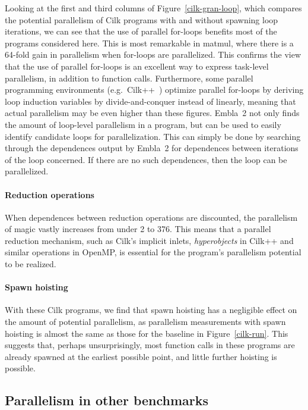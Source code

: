 Looking at the first and third columns of Figure~\ref{cilk-gran-loop}, which compares the potential parallelism of Cilk programs with and without spawning loop iterations, we can see that the use of parallel for-loops benefits most of the programs considered here.
This is most remarkable in \textsf{matmul}, where there is a 64-fold gain in parallelism when for-loops are parallelized.
This confirms the view that the use of parallel for-loops is an excellent way to express task-level parallelism, in addition to function calls.
Furthermore, some parallel programming environments (e.g.\ Cilk++~\cite{leiserson09cilk}) optimize parallel for-loops by deriving loop induction variables by divide-and-conquer instead of linearly,
meaning that actual parallelism may be even higher than these figures.
Embla~2 not only finds the amount of loop-level parallelism in a program, but can be used to easily identify candidate loops for parallelization.
This can simply be done by searching through the dependences output by Embla~2 for dependences between iterations of the loop concerned.
If there are no such dependences, then the loop can be parallelized.

\paragraph{Reduction operations}

When dependences between reduction operations are discounted,
the parallelism of \textsf{magic} vastly increases from under 2 to 376.
This means that a parallel reduction mechanism, such as Cilk's implicit inlets, \emph{hyperobjects} in Cilk++ and similar operations in OpenMP,
is essential for the program's parallelism potential to be realized.

\paragraph{Spawn hoisting}

With these Cilk programs, we find that spawn hoisting has a negligible effect on the amount of potential parallelism, as parallelism measurements with spawn hoisting is almost the same as those for the baseline in Figure~\ref{cilk-run}.
This suggests that, perhaps unsurprisingly, most function calls in these programs are already spawned at the earliest possible point, and little further hoisting is possible.

\subsection{Parallelism in other benchmarks} \label{sresults:benchmarks}

